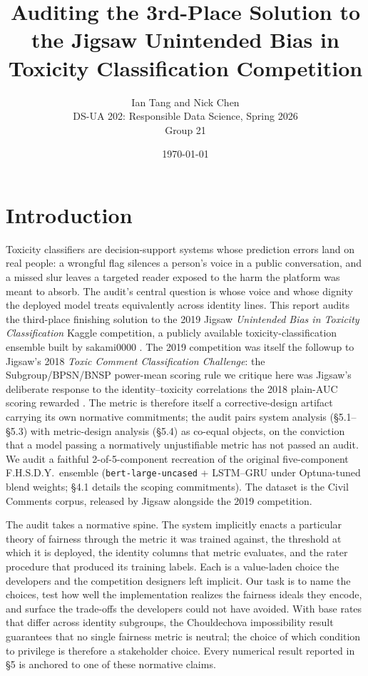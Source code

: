 \documentclass[11pt]{article}
\title{Auditing the 3rd-Place Solution to the Jigsaw Unintended Bias in Toxicity Classification Competition}
\author{Ian Tang and Nick Chen \\ DS-UA 202: Responsible Data Science, Spring 2026 \\ Group 21}
\date{\today}
\begin{document}
\maketitle

\section{Introduction}

Toxicity classifiers are decision-support systems whose prediction errors land on real people: a wrongful flag silences a person's voice in a public conversation, and a missed slur leaves a targeted reader exposed to the harm the platform was meant to absorb. The audit's central question is whose voice and whose dignity the deployed model treats equivalently across identity lines. This report audits the third-place finishing solution to the 2019 Jigsaw \emph{Unintended Bias in Toxicity Classification} Kaggle competition, a publicly available toxicity-classification ensemble built by sakami0000 \citep{sakami2019jigsaw}. The 2019 competition was itself the followup to Jigsaw's 2018 \emph{Toxic Comment Classification Challenge}: the Subgroup/BPSN/BNSP power-mean scoring rule we critique here was Jigsaw's deliberate response to the identity--toxicity correlations the 2018 plain-AUC scoring rewarded \citep{borkan2019nuanced}. The metric is therefore itself a corrective-design artifact carrying its own normative commitments; the audit pairs system analysis (\S5.1--\S5.3) with metric-design analysis (\S5.4) as co-equal objects, on the conviction that a model passing a normatively unjustifiable metric has not passed an audit. We audit a faithful 2-of-5-component recreation of the original five-component F.H.S.D.Y.\ ensemble (\texttt{bert-large-uncased} + LSTM--GRU under Optuna-tuned blend weights; \S4.1 details the scoping commitments). The dataset is the Civil Comments corpus, released by Jigsaw alongside the 2019 competition.

The audit takes a normative spine. The system implicitly enacts a particular theory of fairness through the metric it was trained against, the threshold at which it is deployed, the identity columns that metric evaluates, and the rater procedure that produced its training labels. Each is a value-laden choice the developers and the competition designers left implicit. Our task is to name the choices, test how well the implementation realizes the fairness ideals they encode, and surface the trade-offs the developers could not have avoided. With base rates that differ across identity subgroups, the Chouldechova impossibility result \citep{chouldechova2017fair} guarantees that no single fairness metric is neutral; the choice of which condition to privilege is therefore a stakeholder choice. Every numerical result reported in \S5 is anchored to one of these normative claims.
\end{document}
